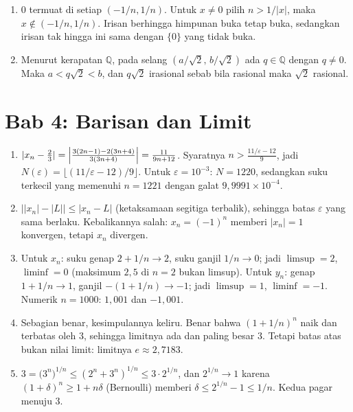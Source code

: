 \begin{enumerate}[label=\textbf{3.\arabic*}]
  \item $0$ termuat di setiap $(-1/n,1/n)$. Untuk $x\ne0$ pilih $n>1/|x|$, maka
        $x\notin(-1/n,1/n)$. Irisan berhingga himpunan buka tetap buka, sedangkan
        irisan tak hingga ini sama dengan $\{0\}$ yang tidak buka.

  \item Menurut kerapatan $\mathbb{Q}$, pada selang $(a/\sqrt2,\,b/\sqrt2)$ ada
        $q\in\mathbb{Q}$ dengan $q\ne0$. Maka $a<q\sqrt2<b$, dan $q\sqrt2$ irasional
        sebab bila rasional maka $\sqrt2$ rasional.
\end{enumerate}

\section*{Bab 4: Barisan dan Limit}
\begin{enumerate}[label=\textbf{4.\arabic*}]
  \item $|x_{n}-\tfrac23|=\Bigl|\frac{3(2n-1)-2(3n+4)}{3(3n+4)}\Bigr|
        =\frac{11}{9n+12}$. Syaratnya $n>\frac{11/\varepsilon-12}{9}$, jadi
        $N(\varepsilon)=\bigl\lfloor(11/\varepsilon-12)/9\bigr\rfloor$. Untuk
        $\varepsilon=10^{-3}$: $N=1220$, sedangkan suku terkecil yang memenuhi
        $n=1221$ dengan galat $9{,}9991\times10^{-4}$.

  \item $\bigl||x_{n}|-|L|\bigr|\le|x_{n}-L|$ (ketaksamaan segitiga terbalik),
        sehingga batas $\varepsilon$ yang sama berlaku. Kebalikannya salah:
        $x_{n}=(-1)^{n}$ memberi $|x_{n}|=1$ konvergen, tetapi $x_{n}$ divergen.

  \item Untuk $x_{n}$: suku genap $2+1/n\to2$, suku ganjil $1/n\to0$; jadi
        $\limsup=2$, $\liminf=0$ (maksimum $2{,}5$ di $n=2$ bukan limsup). Untuk
        $y_{n}$: genap $1+1/n\to1$, ganjil $-(1+1/n)\to-1$; jadi $\limsup=1$,
        $\liminf=-1$. Numerik $n=1000$: $1{,}001$ dan $-1{,}001$.

  \item Sebagian benar, kesimpulannya keliru. Benar bahwa $(1+1/n)^{n}$ naik dan
        terbatas oleh $3$, sehingga limitnya ada dan paling besar $3$. Tetapi batas
        atas bukan nilai limit: limitnya $e\approx 2{,}7183$.

  \item $3=\bigl(3^{n}\bigr)^{1/n}\le(2^{n}+3^{n})^{1/n}\le 3\cdot 2^{1/n}$, dan
        $2^{1/n}\to1$ karena $(1+\delta)^{n}\ge 1+n\delta$ (Bernoulli) memberi
        $\delta\le 2^{1/n}-1\le 1/n$. Kedua pagar menuju $3$.


\end{enumerate}
